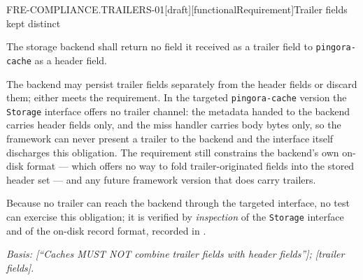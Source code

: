 \begin{requirement}{FRE-COMPLIANCE.TRAILERS-01}[draft][functionalRequirement]{Trailer fields kept distinct}


  The storage backend shall return no field it received as a trailer field
  to \texttt{pingora-cache} as a header field.

  The backend may persist trailer fields separately from the header fields
  or discard them; either meets the requirement. In the targeted
  \texttt{pingora-cache} version the \texttt{Storage} interface offers no
  trailer channel: the metadata handed to the backend carries header fields
  only, and the miss handler carries body bytes only, so the framework can
  never present a trailer to the backend and the interface itself discharges
  this obligation. The requirement still constrains the backend's own on-disk
  format --- which offers no way to fold trailer-originated fields into the
  stored header set --- and any future framework version that does carry
  trailers.

  Because no trailer can reach the backend through the targeted interface, no
  test can exercise this obligation; it is verified by \emph{inspection} of the
  \texttt{Storage} interface and of the on-disk record format, recorded in
  .

  \textit{Basis: [``Caches MUST NOT combine trailer fields with
  header fields'']; [trailer fields].}



\end{requirement}


